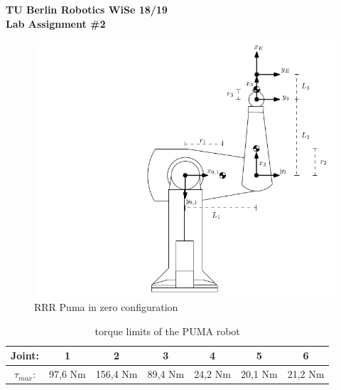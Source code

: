 \documentclass[a4paper,10pt]{article}
\begin{document}
\begin{center}
  \textbf{\Huge TU Berlin Robotics WiSe 18/19} \\
  \textbf{\huge Lab Assignment \#2}
\end{center}

\vfill

\begin{figure}[H]
  \centering
  \includegraphics[scale=1.9]{img/robot_arm.png}
  \caption{RRR Puma in zero configuration}
\end{figure}

\begin{table}[h!]
  \begin{center}
    \begin{tabular}{c|c|c|c|c|c|c}
      Joint: & 1 & 2 & 3 & 4 & 5 & 6\\\hline
      $\tau_{max}$: & 97,6 Nm & 156,4 Nm & 89,4 Nm & 24,2 Nm & 20,1 Nm & 21,2 Nm
    \end{tabular}
    \caption{torque limits of the PUMA robot}
  \end{center}
\end{table}

\vfill
\end{document}

